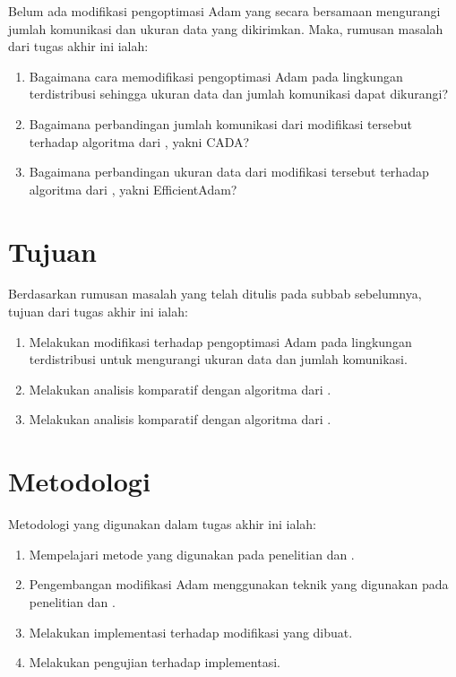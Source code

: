 Belum ada modifikasi pengoptimasi Adam yang secara bersamaan mengurangi jumlah komunikasi dan ukuran data yang dikirimkan. Maka, rumusan masalah dari tugas akhir ini ialah:

\begin{enumerate}
    \item Bagaimana cara memodifikasi pengoptimasi Adam pada lingkungan terdistribusi sehingga ukuran data dan jumlah komunikasi dapat dikurangi?
    \item Bagaimana perbandingan jumlah komunikasi dari modifikasi tersebut terhadap algoritma dari \textcite{Chen2021CADA}, yakni CADA?
    \item Bagaimana perbandingan ukuran data dari modifikasi tersebut terhadap algoritma dari \textcite{Chen2022Efficient}, yakni EfficientAdam?
\end{enumerate}

\section{Tujuan}

Berdasarkan rumusan masalah yang telah ditulis pada subbab sebelumnya, tujuan dari tugas akhir ini ialah:
\begin{enumerate}
    \item Melakukan modifikasi terhadap pengoptimasi Adam pada lingkungan terdistribusi untuk mengurangi ukuran data dan jumlah komunikasi.
    \item Melakukan analisis komparatif dengan algoritma dari \textcite{Chen2021CADA}.
    \item Melakukan analisis komparatif dengan algoritma dari \textcite{Chen2022Efficient}.
\end{enumerate}

\section{Metodologi}

Metodologi yang digunakan dalam tugas akhir ini ialah:
\begin{enumerate}
    \item Mempelajari metode yang digunakan pada penelitian \textcite{Chen2021CADA} dan \textcite{Chen2022Efficient}.
    \item Pengembangan modifikasi Adam menggunakan teknik yang digunakan pada penelitian \textcite{Chen2021CADA} dan \textcite{Chen2022Efficient}.
    \item Melakukan implementasi terhadap modifikasi yang dibuat.
    \item Melakukan pengujian terhadap implementasi.
\end{enumerate}

